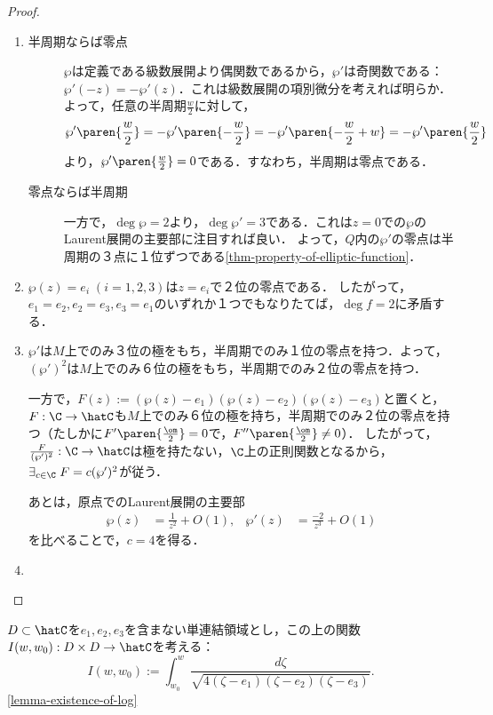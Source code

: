 \documentclass[uplatex, dvipdfmx]{jsreport}
\begin{document}
\begin{proof}\mbox{}
    \begin{enumerate}
        \item 
        \begin{description}
            \item[半周期ならば零点] $\wp$は定義である級数展開より偶関数であるから，$\wp'$は奇関数である：$\wp'(-z)=-\wp'(z)$．これは級数展開の項別微分を考えれば明らか．
            よって，任意の半周期$\frac{w}{2}$に対して，
            \[\wp'\paren{\frac{w}{2}}=-\wp'\paren{-\frac{w}{2}}=-\wp'\paren{-\frac{w}{2}+w}=-\wp'\paren{\frac{w}{2}}\]
            より，$\wp'\paren{\frac{w}{2}}=0$である．すなわち，半周期は零点である．
            \item[零点ならば半周期]
            一方で，$\deg\wp=2$より，$\deg\wp'=3$である．これは$z=0$での$\wp$のLaurent展開の主要部に注目すれば良い．
            よって，$Q$内の$\wp'$の零点は半周期の３点に１位ずつである\ref{thm-property-of-elliptic-function}．
        \end{description}
        \item $\wp(z)=e_i\;(i=1,2,3)$は$z=e_i$で２位の零点である．
        したがって，$e_1=e_2,e_2=e_3,e_3=e_1$のいずれか１つでもなりたてば，$\deg f=2$に矛盾する．
        \item $\wp'$は$M$上でのみ３位の極をもち，半周期でのみ１位の零点を持つ．よって，$(\wp')^2$は$M$上でのみ６位の極をもち，半周期でのみ２位の零点を持つ．

        一方で，$F(z):=(\wp(z)-e_1)(\wp(z)-e_2)(\wp(z)-e_3)$と置くと，$F:\C\to\hatC$も$M$上でのみ６位の極を持ち，半周期でのみ２位の零点を持つ（たしかに$F'\paren{\frac{\om}{2}}=0$で，$F''\paren{\frac{\om}{2}}\ne0$）．
        したがって，$\frac{F}{(\wp')^2}:\C\to\hatC$は極を持たない，$\C$上の正則関数となるから，$\exists_{c\in\C}\;F=c(\wp')^2$が従う．
        
        あとは，原点でのLaurent展開の主要部
        \begin{align*}
            \wp(z)&=\frac{1}{z^2}+O(1),&\wp'(z)&=\frac{-2}{z^3}+O(1)
        \end{align*}
        を比べることで，$c=4$を得る．
        \item 

    \end{enumerate}
\end{proof}
\begin{remark}[楕円積分]
    $D\subset\hatC$を$e_1,e_2,e_3$を含まない単連結領域とし，この上の関数$I(w,w_0):D\times D\to\hatC$を考える：
    \[I(w,w_0):=\int^w_{w_0}\frac{d\zeta}{\sqrt{4(\zeta-e_1)(\zeta-e_2)(\zeta-e_3)}}.\]
    \ref{lemma-existence-of-log}
\end{remark}
\end{document}

